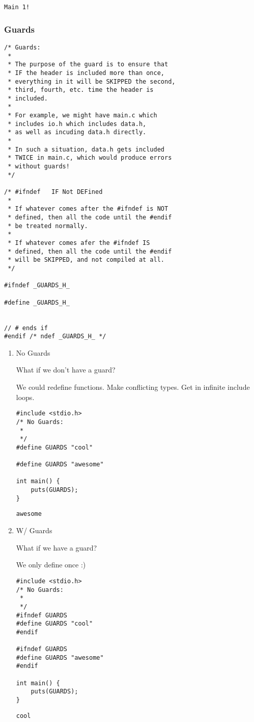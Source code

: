 \documentclass[11pt]{article}
\begin{document}
\begin{verbatim}
Main 1!
\end{verbatim}

\subsubsection{Guards}
\label{sec:org9dce65e}

\begin{verbatim}
/* Guards:
 * 
 * The purpose of the guard is to ensure that
 * IF the header is included more than once,
 * everything in it will be SKIPPED the second,
 * third, fourth, etc. time the header is
 * included.
 * 
 * For example, we might have main.c which
 * includes io.h which includes data.h,
 * as well as incuding data.h directly.
 * 
 * In such a situation, data.h gets included
 * TWICE in main.c, which would produce errors
 * without guards!
 */

/* #ifndef   IF Not DEFined
 * 
 * If whatever comes after the #ifndef is NOT
 * defined, then all the code until the #endif
 * be treated normally.
 * 
 * If whatever comes afer the #ifndef IS
 * defined, then all the code until the #endif
 * will be SKIPPED, and not compiled at all.
 */

#ifndef _GUARDS_H_

#define _GUARDS_H_


// # ends if
#endif /* ndef _GUARDS_H_ */
\end{verbatim}


\begin{enumerate}
\item No Guards
\label{sec:org695766c}

What if we don't have a guard?

We could redefine functions. Make conflicting types. Get in infinite
include loops.

\begin{verbatim}
#include <stdio.h>
/* No Guards:
 * 
 */
#define GUARDS "cool"

#define GUARDS "awesome"

int main() {
    puts(GUARDS);
}
\end{verbatim}

\begin{verbatim}
awesome
\end{verbatim}

\item W/ Guards
\label{sec:orga31a47a}

What if we have a guard?

We only define once :)

\begin{verbatim}
#include <stdio.h>
/* No Guards:
 * 
 */
#ifndef GUARDS
#define GUARDS "cool"
#endif

#ifndef GUARDS
#define GUARDS "awesome"
#endif

int main() {
    puts(GUARDS);
}
\end{verbatim}

\begin{verbatim}
cool
\end{verbatim}
\end{enumerate}
\end{document}
